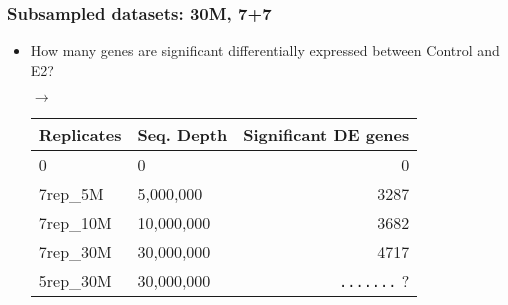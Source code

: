 \subsubsection{Subsampled datasets: 30M, 7+7}
\begin{itemize}
	\item How many genes are significant differentially expressed between Control and E2?
	\item[$\rightarrow$] \begin{tabular}{ | l | l | r | }
	\hline
	Replicates & Seq. Depth & Significant DE genes \\
	\hline
	0          & 0          & 0\quad\quad \\
	7rep\_5M   & 5,000,000  & 3287\quad\quad \\
	7rep\_10M  & 10,000,000 & 3682\quad\quad \\
	7rep\_30M  & 30,000,000 & 4717\quad\quad \\
	5rep\_30M  & 30,000,000 & \verb|.......| ? \\
	\hline
	\end{tabular}
\end{itemize}

